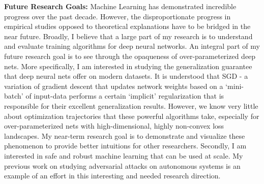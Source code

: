 \documentclass[11pt]{article}
\begin{document}
\textbf{Future Research Goals:} Machine Learning has demonstrated incredible progress over the past decade. However, the disproportionate progress in empirical studies opposed to theoretical explanations have to be bridged in the near future. Broadly, I believe that a large part of my research is to understand and evaluate training algorithms for deep neural networks. An integral part of my future research goal is to see through the opaqueness of over-parameterized deep nets. More specifically, I am interested in studying the generalization guarantee that deep neural nets offer on modern datasets. It is understood that SGD - a variation of gradient descent that updates network weights based on a `mini-batch' of input-data performs a certain `implicit' regularization that is responsible for their excellent generalization results. However, we know very little about optimization trajectories that these powerful algorithms take, especially for over-parameterized nets with high-dimensional, highly non-convex loss landscapes. My near-term research goal is to demonstrate and visualize these phenomenon to provide better intuitions for other researchers. Secondly, I am interested in safe and robust machine learning that can be used at scale. My previous work on studying adversarial attacks on autonomous systems is an example of an effort in this interesting and needed research direction. 


\end{document}
